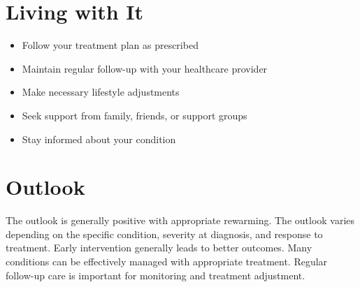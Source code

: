 \section{Living with It}
\begin{itemize}[noitemsep]
  \item Follow your treatment plan as prescribed
  \item Maintain regular follow-up with your healthcare provider
  \item Make necessary lifestyle adjustments
  \item Seek support from family, friends, or support groups
  \item Stay informed about your condition
\end{itemize}
\section{Outlook}
The outlook is generally positive with appropriate rewarming. The outlook varies depending on the specific condition, severity at diagnosis, and response to treatment. Early intervention generally leads to better outcomes. Many conditions can be effectively managed with appropriate treatment. Regular follow-up care is important for monitoring and treatment adjustment.
